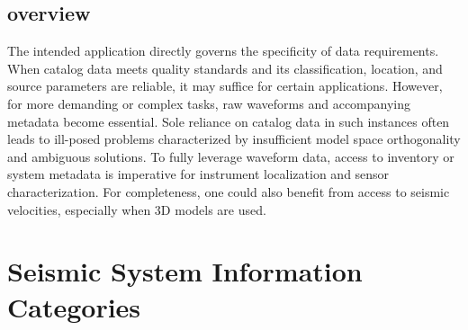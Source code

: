 
\subsection{overview}

The intended application directly governs the specificity of data requirements. When catalog data meets quality standards and its classification, location, and source parameters are reliable, it may suffice for certain applications. However, for more demanding or complex tasks, raw waveforms and accompanying metadata become essential. Sole reliance on catalog data in such instances often leads to ill-posed problems characterized by insufficient model space orthogonality and ambiguous solutions. To fully leverage waveform data, access to inventory or system metadata is imperative for instrument localization and sensor characterization. For completeness, one could also benefit from access to seismic velocities, especially when 3D models are used.

\section{Seismic System Information Categories}

